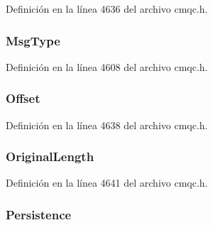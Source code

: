 Definición en la línea 4636 del archivo cmqc.\+h.

\hypertarget{structtag_m_q_m_d2_a22732037d5385ab03eb3e9d9a5e60843}{}
\subsubsection[{Msg\+Type}]{ Msg\+Type}\label{structtag_m_q_m_d2_a22732037d5385ab03eb3e9d9a5e60843}


Definición en la línea 4608 del archivo cmqc.\+h.

\hypertarget{structtag_m_q_m_d2_aac8433c970f16a602e3b79400e87d28b}{}
\subsubsection[{Offset}]{ Offset}\label{structtag_m_q_m_d2_aac8433c970f16a602e3b79400e87d28b}


Definición en la línea 4638 del archivo cmqc.\+h.

\hypertarget{structtag_m_q_m_d2_acf39c0c6d2618f565cf8315c8775b5ae}{}
\subsubsection[{Original\+Length}]{ Original\+Length}\label{structtag_m_q_m_d2_acf39c0c6d2618f565cf8315c8775b5ae}


Definición en la línea 4641 del archivo cmqc.\+h.

\hypertarget{structtag_m_q_m_d2_af0f253d60fa2dcbe2bda530c88661853}{}
\subsubsection[{Persistence}]{ Persistence}\label{structtag_m_q_m_d2_af0f253d60fa2dcbe2bda530c88661853}



